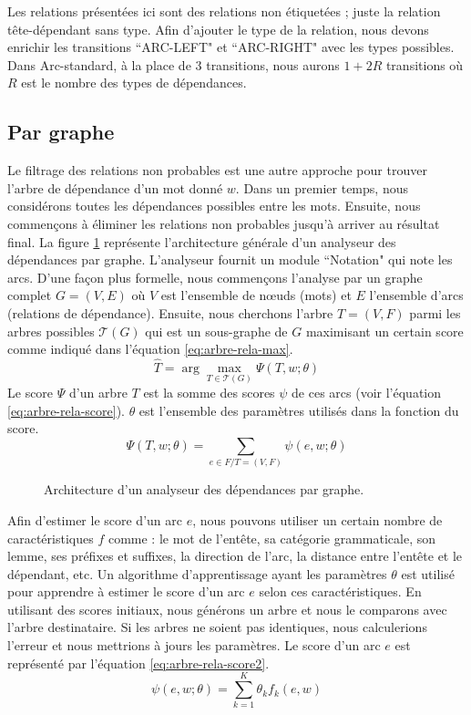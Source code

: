 \documentclass{KodeBook}
\begin{document}
Les relations présentées ici sont des relations non étiquetées ; juste la relation tête-dépendant sans type.
Afin d'ajouter le type de la relation, nous devons enrichir les transitions ``ARC-LEFT" et ``ARC-RIGHT" avec les types possibles. 
Dans Arc-standard, à la place de 3 transitions, nous aurons $1+2R$ transitions où $R$ est le nombre des types de dépendances.

\subsection{Par graphe}

Le filtrage des relations non probables est une autre approche pour trouver l'arbre de dépendance d'un mot donné $w$. 
Dans un premier temps, nous considérons toutes les dépendances possibles entre les mots. 
Ensuite, nous commençons à éliminer les relations non probables jusqu'à arriver au résultat final. 
La figure \ref{fig:dep-graph-arch} représente l'architecture générale d'un analyseur des dépendances par graphe.
L'analyseur fournit un module ``Notation" qui note les arcs.
D'une façon plus formelle, nous commençons l'analyse par un graphe complet $G = (V, E)$ où $V$ est l'ensemble de nœuds (mots) et $E$ l'ensemble d'arcs (relations de dépendance). 
Ensuite, nous cherchons l'arbre $T = (V, F)$ parmi les arbres possibles $\mathcal{T}(G)$ qui est un sous-graphe de $G$ maximisant un certain score comme indiqué dans l'équation \ref{eq:arbre-rela-max}.
\begin{equation}
\hat{T} = \arg\max\limits_{T \in \mathcal{T}(G)} \Psi(T, w; \theta)
\label{eq:arbre-rela-max}
\end{equation}
Le score $\Psi$ d'un arbre $T$ est la somme des scores $\psi$ de ces arcs (voir l'équation \ref{eq:arbre-rela-score}). 
$\theta$ est l'ensemble des paramètres utilisés dans la fonction du score.
\begin{equation}
\Psi(T, w; \theta) = \sum_{e \in F / T = (V, F)} \psi(e, w; \theta)
\label{eq:arbre-rela-score}
\end{equation}

\begin{figure}[ht]
	\centering
	\caption{Architecture d'un analyseur des dépendances par graphe.}
	\label{fig:dep-graph-arch}
\end{figure}

Afin d'estimer le score d'un arc $e$, nous pouvons utiliser un certain nombre de caractéristiques $f$ comme : le mot de l'entête, sa catégorie grammaticale, son lemme, ses préfixes et suffixes, la direction de l'arc, la distance entre l'entête et le dépendant, etc.
Un algorithme d'apprentissage ayant les paramètres $\theta$ est utilisé pour apprendre à estimer le score d'un arc $e$ selon ces caractéristiques. 
En utilisant des scores initiaux, nous générons un arbre et nous le comparons avec l'arbre destinataire. 
Si les arbres ne soient pas identiques, nous calculerions l'erreur et nous mettrions à jours les paramètres.
Le score d'un arc $e$ est représenté par l'équation \ref{eq:arbre-rela-score2}.
\begin{equation}
\psi(e, w; \theta) = \sum_{k = 1}^{K} \theta_k f_k(e, w)
\label{eq:arbre-rela-score2}
\end{equation}
\end{document}
